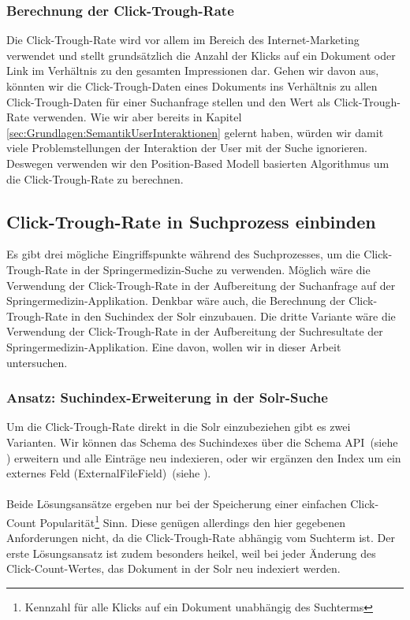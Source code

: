 \subsubsection{Berechnung der Click-Trough-Rate}
\label{sec:Reranking:Methodik:Click-Trough-Daten:Gewichtung}

Die Click-Trough-Rate wird vor allem im Bereich des Internet-Marketing verwendet und stellt grundsätzlich die Anzahl der Klicks auf ein Dokument oder Link im Verhältnis zu den gesamten Impressionen dar. Gehen wir davon aus, könnten wir die Click-Trough-Daten eines Dokuments ins Verhältnis zu allen Click-Trough-Daten für einer Suchanfrage stellen und den Wert als Click-Trough-Rate verwenden. Wie wir aber bereits in Kapitel \ref{sec:Grundlagen:SemantikUserInteraktionen} gelernt haben, würden wir damit viele Problemstellungen der Interaktion der User mit der Suche ignorieren. Deswegen verwenden wir den Position-Based Modell basierten Algorithmus um die Click-Trough-Rate zu berechnen.

\subsection{Click-Trough-Rate in Suchprozess einbinden}
\label{sec:Reranking:Methodik:SucheEinbinden}

Es gibt drei mögliche Eingriffspunkte während des Suchprozesses, um die Click-Trough-Rate in der Springermedizin-Suche zu verwenden. Möglich wäre die Verwendung der Click-Trough-Rate in der Aufbereitung der Suchanfrage auf der Springermedizin-Applikation. Denkbar wäre auch, die Berechnung der Click-Trough-Rate in den Suchindex der Solr einzubauen. Die dritte Variante wäre die Verwendung der Click-Trough-Rate in der Aufbereitung der Suchresultate der Springermedizin-Applikation. Eine davon, wollen wir in dieser Arbeit untersuchen. 

\subsubsection{Ansatz: Suchindex-Erweiterung in der Solr-Suche}
\label{sec:Reranking:Methodik:SucheEinbinden:SolrSuche}

Um die Click-Trough-Rate direkt in die Solr einzubeziehen gibt es zwei Varianten. Wir können das Schema des Suchindexes über die Schema API~(siehe \cite{SchemaAPISolr}) erweitern und alle Einträge neu indexieren, oder wir ergänzen den Index um ein externes Feld (ExternalFileField)~(siehe \cite{ExtFieldSolr}).
\\
\\
Beide Lösungsansätze ergeben nur bei der Speicherung einer einfachen Click-Count Popularität\footnote{Kennzahl für alle Klicks auf ein Dokument unabhängig des Suchterms} Sinn. Diese genügen allerdings den hier gegebenen Anforderungen nicht, da die Click-Trough-Rate abhängig vom Suchterm ist. Der erste Lösungsansatz ist zudem besonders heikel, weil bei jeder Änderung des Click-Count-Wertes, das Dokument in der Solr neu indexiert werden.

